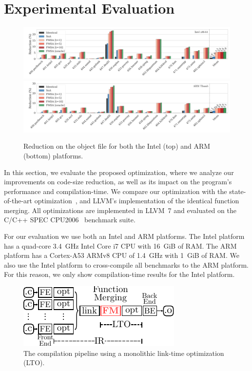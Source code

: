 \section{Experimental Evaluation}
\begin{figure}[t!]
  \centering
  \includegraphics[width=\linewidth]{figs/reduction-obj-intel-label.pdf}
  \includegraphics[width=\linewidth]{figs/reduction-obj-arm-label.pdf}
  \caption{Reduction on the object file for both the Intel (top) and ARM (bottom) platforms.}
  \label{fig:reduction-obj}
\end{figure}

In this section, we evaluate the proposed optimization, where we analyze our
improvements on code-size reduction, as well as its impact on the program's
performance and compilation-time.
We compare our optimization with the state-of-the-art optimization~\cite{edler14},
and LLVM's implementation of the identical function merging.
All optimizations are implemented in LLVM~7 and evaluated on the C/C++ SPEC
CPU2006~\cite{spec} benchmark suite.

For our evaluation we use both an Intel and ARM platforms.
The Intel platform has a quad-core 3.4~GHz Intel Core i7 CPU with 16~GiB of RAM.
The ARM platform has a Cortex-A53 ARMv8 CPU of 1.4~GHz with 1~GiB of RAM.
We also use the Intel platform to cross-compile all benchmarks to the ARM
platform.
For this reason, we only show compilation-time results for the Intel platform.

\begin{figure}[t!]
  \centering
  \includegraphics[width=0.8\linewidth]{figs/opt-pipeline.pdf}
  \caption{The compilation pipeline using a monolithic link-time optimization (LTO).}
  \label{fig:opt-pipeline}
\end{figure}

